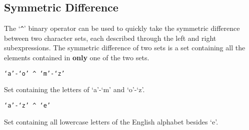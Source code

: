 
\subsection{Symmetric Difference}
{
	The `\texttt{\^}' binary operator can be used to quickly take the
	symmetric difference between two character sets, each described through
	the left and right subexpressions. The symmetric difference of two sets is
	a set containing all the elements contained in \textbf{only} one of the
	two sets.
	
	\begin{itemize}
	{
		\item[] \texttt{`a'-`o' \^{} `m'-`z'}
		
			Set containing the letters of `a'-`m'
			and `o'-`z'.
		
		\item[] \texttt{`a'-`z' \^{} `e'}
		
			Set containing all lowercase letters
			of the English alphabet besides `e'.
	}
	\end{itemize}
}
